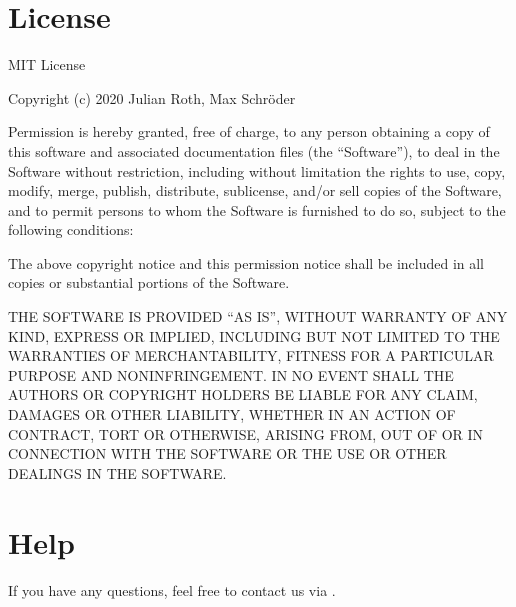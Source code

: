 \documentclass[letterpaper,10pt,english, openany]{sphinxmanual}
\begin{document}
\chapter{License}
\label{\detokenize{license:license}}\label{\detokenize{license::doc}}
MIT License

Copyright (c) 2020 Julian Roth, Max Schröder

Permission is hereby granted, free of charge, to any person obtaining a copy
of this software and associated documentation files (the “Software”), to deal
in the Software without restriction, including without limitation the rights
to use, copy, modify, merge, publish, distribute, sublicense, and/or sell
copies of the Software, and to permit persons to whom the Software is
furnished to do so, subject to the following conditions:

The above copyright notice and this permission notice shall be included in all
copies or substantial portions of the Software.

THE SOFTWARE IS PROVIDED “AS IS”, WITHOUT WARRANTY OF ANY KIND, EXPRESS OR
IMPLIED, INCLUDING BUT NOT LIMITED TO THE WARRANTIES OF MERCHANTABILITY,
FITNESS FOR A PARTICULAR PURPOSE AND NONINFRINGEMENT. IN NO EVENT SHALL THE
AUTHORS OR COPYRIGHT HOLDERS BE LIABLE FOR ANY CLAIM, DAMAGES OR OTHER
LIABILITY, WHETHER IN AN ACTION OF CONTRACT, TORT OR OTHERWISE, ARISING FROM,
OUT OF OR IN CONNECTION WITH THE SOFTWARE OR THE USE OR OTHER DEALINGS IN THE
SOFTWARE.


\chapter{Help}
\label{\detokenize{help:help}}\label{\detokenize{help::doc}}
If you have any questions, feel free to contact us via .




\renewcommand{\indexname}{Index}
\printindex
\end{document}
